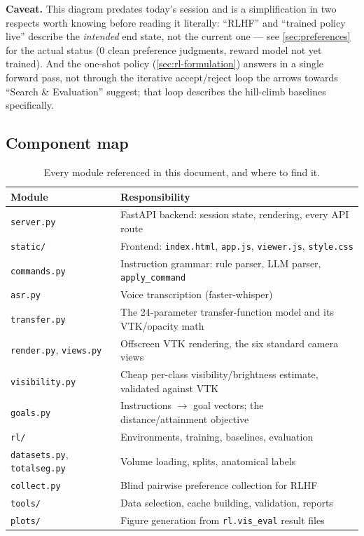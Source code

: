 \documentclass[10pt]{article}
\newcommand{\caveattext}[1]{\begin{findingbox}[colframe=black!30]\textbf{Caveat.} #1\end{findingbox}}
\newcommand{\code}[1]{\texttt{#1}}
\begin{document}
\caveattext{This diagram predates today's session and is a simplification in
two respects worth knowing before reading it literally: ``RLHF'' and
``trained policy live'' describe the \emph{intended} end state, not the
current one --- see \cref{sec:preferences} for the actual status (0 clean
preference judgments, reward model not yet trained). And the one-shot policy
(\cref{sec:rl-formulation}) answers in a single forward pass, not through the
iterative accept/reject loop the arrows towards ``Search \& Evaluation''
suggest; that loop describes the hill-climb baselines specifically.}

\subsection{Component map}

\begin{table}[h]
\centering\small
\begin{tabular}{@{}ll@{}}
\toprule
\textbf{Module} & \textbf{Responsibility} \\
\midrule
\code{server.py} & FastAPI backend: session state, rendering, every API route \\
\code{static/} & Frontend: \code{index.html}, \code{app.js}, \code{viewer.js}, \code{style.css} \\
\code{commands.py} & Instruction grammar: rule parser, LLM parser, \code{apply\_command} \\
\code{asr.py} & Voice transcription (faster-whisper) \\
\code{transfer.py} & The 24-parameter transfer-function model and its VTK/opacity math \\
\code{render.py}, \code{views.py} & Offscreen VTK rendering, the six standard camera views \\
\code{visibility.py} & Cheap per-class visibility/brightness estimate, validated against VTK \\
\code{goals.py} & Instructions $\rightarrow$ goal vectors; the distance/attainment objective \\
\code{rl/} & Environments, training, baselines, evaluation \\
\code{datasets.py}, \code{totalseg.py} & Volume loading, splits, anatomical labels \\
\code{collect.py} & Blind pairwise preference collection for RLHF \\
\code{tools/} & Data selection, cache building, validation, reports \\
\code{plots/} & Figure generation from \code{rl.vis\_eval} result files \\
\bottomrule
\end{tabular}
\caption{Every module referenced in this document, and where to find it.}
\end{table}
\end{document}
